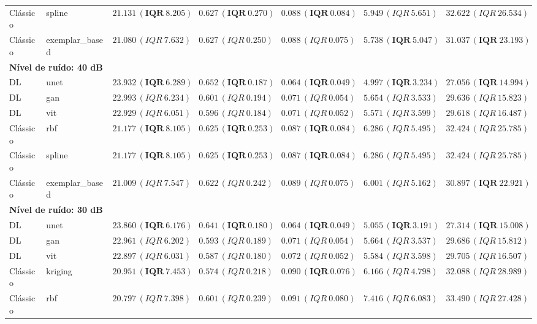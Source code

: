 \begin{table}[htbp]
{\begin{tabular}{llccccc}
Clássico & spline & $\mathbf{21.131\,(IQR\ 8.205)}$ & $\mathbf{0.627\,(IQR\ 0.270)}$ & $\mathbf{0.088\,(IQR\ 0.084)}$ & $5.949\,(IQR\ 5.651)$ & $32.622\,(IQR\ 26.534)$ \\
Clássico & exemplar\_based & $21.080\,(IQR\ 7.632)$ & $0.627\,(IQR\ 0.250)$ & $0.088\,(IQR\ 0.075)$ & $\mathbf{5.738\,(IQR\ 5.047)}$ & $\mathbf{31.037\,(IQR\ 23.193)}$ \\
\midrule
\multicolumn{7}{l}{\textbf{Nível de ruído: 40 dB}} \\
DL & unet & $\mathbf{23.932\,(IQR\ 6.289)}$ & $\mathbf{0.652\,(IQR\ 0.187)}$ & $\mathbf{0.064\,(IQR\ 0.049)}$ & $\mathbf{4.997\,(IQR\ 3.234)}$ & $\mathbf{27.056\,(IQR\ 14.994)}$ \\
DL & gan & $22.993\,(IQR\ 6.234)$ & $0.601\,(IQR\ 0.194)$ & $0.071\,(IQR\ 0.054)$ & $5.654\,(IQR\ 3.533)$ & $29.636\,(IQR\ 15.823)$ \\
DL & vit & $22.929\,(IQR\ 6.051)$ & $0.596\,(IQR\ 0.184)$ & $0.071\,(IQR\ 0.052)$ & $5.571\,(IQR\ 3.599)$ & $29.618\,(IQR\ 16.487)$ \\
Clássico & rbf & $\mathbf{21.177\,(IQR\ 8.105)}$ & $\mathbf{0.625\,(IQR\ 0.253)}$ & $\mathbf{0.087\,(IQR\ 0.084)}$ & $6.286\,(IQR\ 5.495)$ & $32.424\,(IQR\ 25.785)$ \\
Clássico & spline & $\mathbf{21.177\,(IQR\ 8.105)}$ & $\mathbf{0.625\,(IQR\ 0.253)}$ & $\mathbf{0.087\,(IQR\ 0.084)}$ & $6.286\,(IQR\ 5.495)$ & $32.424\,(IQR\ 25.785)$ \\
Clássico & exemplar\_based & $21.009\,(IQR\ 7.547)$ & $0.622\,(IQR\ 0.242)$ & $0.089\,(IQR\ 0.075)$ & $6.001\,(IQR\ 5.162)$ & $\mathbf{30.897\,(IQR\ 22.921)}$ \\
\midrule
\multicolumn{7}{l}{\textbf{Nível de ruído: 30 dB}} \\
DL & unet & $\mathbf{23.860\,(IQR\ 6.176)}$ & $\mathbf{0.641\,(IQR\ 0.180)}$ & $\mathbf{0.064\,(IQR\ 0.049)}$ & $\mathbf{5.055\,(IQR\ 3.191)}$ & $\mathbf{27.314\,(IQR\ 15.008)}$ \\
DL & gan & $22.961\,(IQR\ 6.202)$ & $0.593\,(IQR\ 0.189)$ & $0.071\,(IQR\ 0.054)$ & $5.664\,(IQR\ 3.537)$ & $29.686\,(IQR\ 15.812)$ \\
DL & vit & $22.897\,(IQR\ 6.031)$ & $0.587\,(IQR\ 0.180)$ & $0.072\,(IQR\ 0.052)$ & $5.584\,(IQR\ 3.598)$ & $29.705\,(IQR\ 16.507)$ \\
Clássico & kriging & $\mathbf{20.951\,(IQR\ 7.453)}$ & $0.574\,(IQR\ 0.218)$ & $\mathbf{0.090\,(IQR\ 0.076)}$ & $6.166\,(IQR\ 4.798)$ & $32.088\,(IQR\ 28.989)$ \\
Clássico & rbf & $20.797\,(IQR\ 7.398)$ & $0.601\,(IQR\ 0.239)$ & $0.091\,(IQR\ 0.080)$ & $7.416\,(IQR\ 6.083)$ & $33.490\,(IQR\ 27.428)$ \\

\end{tabular}}
\end{table}

